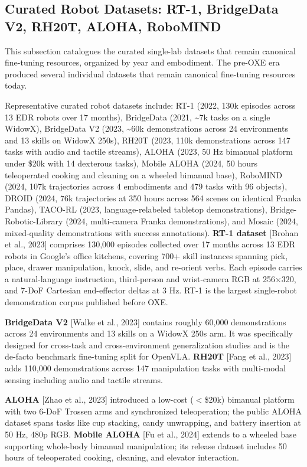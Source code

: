 \subsection{Curated Robot Datasets: RT-1, BridgeData V2, RH20T, ALOHA, RoboMIND}\label{curated-robot-datasets-rt-1-bridgedata-v2-rh20t-aloha-robomind}

This subsection catalogues the curated single-lab datasets that remain canonical fine-tuning resources, organized by year and embodiment. The pre-OXE era produced several individual datasets that remain canonical fine-tuning resources today.

Representative curated robot datasets include: RT-1 (2022, 130k episodes across 13 EDR robots over 17 months), BridgeData (2021, \textasciitilde7k tasks on a single WidowX), BridgeData V2 (2023, \textasciitilde60k demonstrations across 24 environments and 13 skills on WidowX 250s), RH20T (2023, 110k demonstrations across 147 tasks with audio and tactile streams), ALOHA (2023, 50 Hz bimanual platform under \$20k with 14 dexterous tasks), Mobile ALOHA (2024, 50 hours teleoperated cooking and cleaning on a wheeled bimanual base), RoboMIND (2024, 107k trajectories across 4 embodiments and 479 tasks with 96 objects), DROID (2024, 76k trajectories at 350 hours across 564 scenes on identical Franka Pandas), TACO-RL (2023, language-relabeled tabletop demonstrations), Bridge-Robotic-Library (2024, multi-camera Franka demonstrations), and Mosaic (2024, mixed-quality demonstrations with success annotations). \textbf{RT-1 dataset} {[}Brohan et al., 2023{]} comprises 130,000 episodes collected over 17 months across 13 EDR robots in Google's office kitchens, covering 700+ skill instances spanning pick, place, drawer manipulation, knock, slide, and re-orient verbs. Each episode carries a natural-language instruction, third-person and wrist-camera RGB at 256×320, and 7-DoF Cartesian end-effector deltas at 3 Hz. RT-1 is the largest single-robot demonstration corpus published before OXE.

\textbf{BridgeData V2} {[}Walke et al., 2023{]} contains roughly 60,000 demonstrations across 24 environments and 13 skills on a WidowX 250s arm. It was specifically designed for cross-task and cross-environment generalization studies and is the de-facto benchmark fine-tuning split for OpenVLA. \textbf{RH20T} {[}Fang et al., 2023{]} adds 110,000 demonstrations across 147 manipulation tasks with multi-modal sensing including audio and tactile streams.

\textbf{ALOHA} {[}Zhao et al., 2023{]} introduced a low-cost (\(<\)\$20k) bimanual platform with two 6-DoF Trossen arms and synchronized teleoperation; the public ALOHA dataset spans tasks like cup stacking, candy unwrapping, and battery insertion at 50 Hz, 480p RGB. \textbf{Mobile ALOHA} {[}Fu et al., 2024{]} extends to a wheeled base supporting whole-body bimanual manipulation; its release dataset includes 50 hours of teleoperated cooking, cleaning, and elevator interaction.

